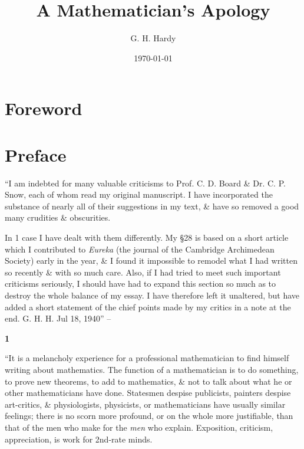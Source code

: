 \documentclass{article}
\title{A Mathematician's Apology}
\author{G. H. Hardy}
\date{\today}
\numberwithin{equation}{section}
\begin{document}
\maketitle
\tableofcontents


\section*{Foreword}


\section*{Preface}
``I am indebted for many valuable criticisms to Prof. C. D. Board \& Dr. C. P. Snow, each of whom read my original manuscript. I have incorporated the substance of nearly all of their suggestions in my text, \& have so removed a good many crudities \& obscurities.

In 1 case I have dealt with them differently. My \S28 is based on a short article which I contributed to \textit{Eureka} (the journal of the Cambridge Archimedean Society) early in the year, \& I found it impossible to remodel what I had written so recently \& with so much care. Also, if I had tried to meet such important criticisms seriously, I should have had to expand this section so much as to destroy the whole balance of my essay. I have therefore left it unaltered, but have added a short statement of the chief points made by my critics in a note at the end. G. H. H. Jul 18, 1940'' -- \cite[p. 59]{Hardy1992}

\begin{center}
	\textbf{1}
\end{center}
``It is a melancholy experience for a professional mathematician to find himself writing about mathematics. The function of a mathematician is to do something, to prove new theorems, to add to mathematics, \& not to talk about what he or other mathematicians have done. Statesmen despise publicists, painters despise art-critics, \& physiologists, physicists, or mathematicians have usually similar feelings; there is no scorn more profound, or on the whole more justifiable, than that of the men who make for the \textit{men} who explain. Exposition, criticism, appreciation, is work for 2nd-rate minds.
\end{document}
